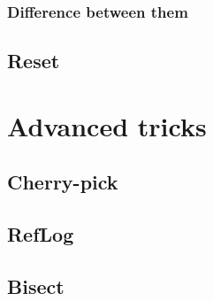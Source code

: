 \documentclass{article}
\begin{document}
\subsubsection{Difference between them}

\subsection{Reset}

\section{Advanced tricks}

\subsection{Cherry-pick}

\subsection{RefLog}

\subsection{Bisect}

\subsection{}
\end{document}
